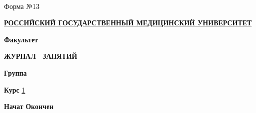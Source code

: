 \documentclass[12pt,a4paper]{extarticle}
\begin{document}

\thispagestyle{empty}

\

\eject

\def\cmnwidth{150mm}

\thispagestyle{empty}

{\hfill {\tiny Форма №13}\hskip 8mm}
\vskip 3mm

\begin{center}
\uline{\textbf{РОССИЙСКИЙ ГОСУДАРСТВЕННЫЙ МЕДИЦИНСКИЙ УНИВЕРСИТЕТ}}
\vskip 10mm

\parbox{\cmnwidth}{\textbf{Факультет} \uline{\hfill\facultyname\hfill}}
\vskip 30mm

\textbf{\Huge{ЖУРНАЛ \ ЗАНЯТИЙ}}
\vskip 10mm

\vskip 25mm

\parbox{\cmnwidth}{\textbf{Группа} \uline{\hfill{\Huge \textbf{\groupname}}\hfill}}
\vskip 5mm

\parbox{\cmnwidth}{\textbf{Курс} \uline{\hfill 1 \hfill}}
\vskip 5mm

\parbox{\cmnwidth}{\textbf{Начат} \uline{\hfill} \textbf{Окончен} \uline{\hfill}}
\vskip 5mm
\end{center}
\end{document}
